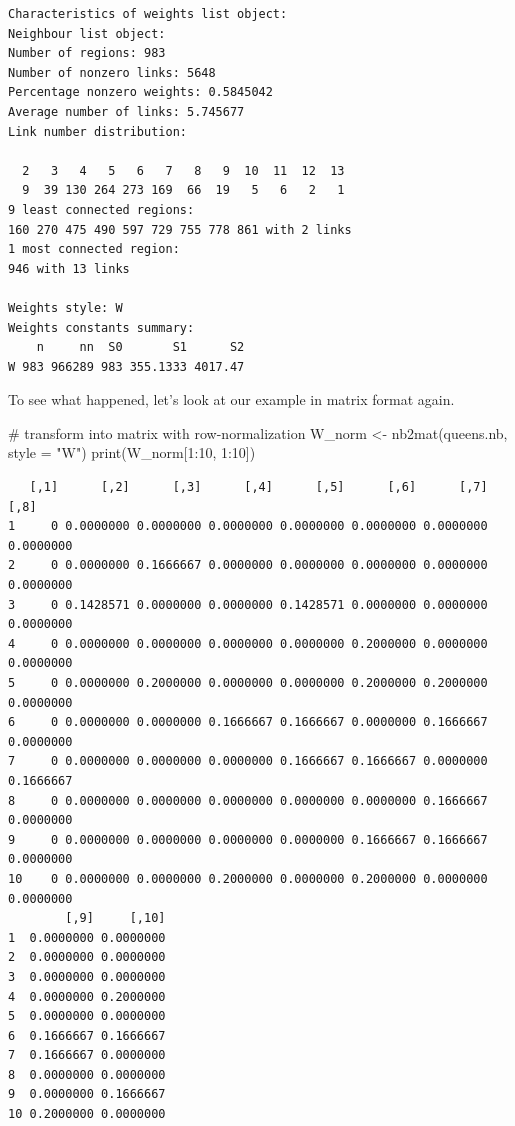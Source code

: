\documentclass[
  letterpaper,
]{scrbook}
\newenvironment{Shaded}{\begin{snugshade}}{\end{snugshade}}
\newcommand{\AttributeTok}[1]{\textcolor[rgb]{0.40,0.45,0.13}{#1}}
\newcommand{\CommentTok}[1]{\textcolor[rgb]{0.37,0.37,0.37}{#1}}
\newcommand{\DecValTok}[1]{\textcolor[rgb]{0.68,0.00,0.00}{#1}}
\newcommand{\FunctionTok}[1]{\textcolor[rgb]{0.28,0.35,0.67}{#1}}
\newcommand{\NormalTok}[1]{\textcolor[rgb]{0.00,0.23,0.31}{#1}}
\newcommand{\OtherTok}[1]{\textcolor[rgb]{0.00,0.23,0.31}{#1}}
\newcommand{\SpecialCharTok}[1]{\textcolor[rgb]{0.37,0.37,0.37}{#1}}
\newcommand{\StringTok}[1]{\textcolor[rgb]{0.13,0.47,0.30}{#1}}
\begin{document}
\begin{verbatim}
Characteristics of weights list object:
Neighbour list object:
Number of regions: 983 
Number of nonzero links: 5648 
Percentage nonzero weights: 0.5845042 
Average number of links: 5.745677 
Link number distribution:

  2   3   4   5   6   7   8   9  10  11  12  13 
  9  39 130 264 273 169  66  19   5   6   2   1 
9 least connected regions:
160 270 475 490 597 729 755 778 861 with 2 links
1 most connected region:
946 with 13 links

Weights style: W 
Weights constants summary:
    n     nn  S0       S1      S2
W 983 966289 983 355.1333 4017.47
\end{verbatim}

To see what happened, let's look at our example in matrix format again.

\begin{Shaded}
\begin{Highlighting}[]
\CommentTok{\# transform into matrix with row{-}normalization}
\NormalTok{W\_norm }\OtherTok{\textless{}{-}} \FunctionTok{nb2mat}\NormalTok{(queens.nb, }\AttributeTok{style =} \StringTok{"W"}\NormalTok{)}
\FunctionTok{print}\NormalTok{(W\_norm[}\DecValTok{1}\SpecialCharTok{:}\DecValTok{10}\NormalTok{, }\DecValTok{1}\SpecialCharTok{:}\DecValTok{10}\NormalTok{])}
\end{Highlighting}
\end{Shaded}

\begin{verbatim}
   [,1]      [,2]      [,3]      [,4]      [,5]      [,6]      [,7]      [,8]
1     0 0.0000000 0.0000000 0.0000000 0.0000000 0.0000000 0.0000000 0.0000000
2     0 0.0000000 0.1666667 0.0000000 0.0000000 0.0000000 0.0000000 0.0000000
3     0 0.1428571 0.0000000 0.0000000 0.1428571 0.0000000 0.0000000 0.0000000
4     0 0.0000000 0.0000000 0.0000000 0.0000000 0.2000000 0.0000000 0.0000000
5     0 0.0000000 0.2000000 0.0000000 0.0000000 0.2000000 0.2000000 0.0000000
6     0 0.0000000 0.0000000 0.1666667 0.1666667 0.0000000 0.1666667 0.0000000
7     0 0.0000000 0.0000000 0.0000000 0.1666667 0.1666667 0.0000000 0.1666667
8     0 0.0000000 0.0000000 0.0000000 0.0000000 0.0000000 0.1666667 0.0000000
9     0 0.0000000 0.0000000 0.0000000 0.0000000 0.1666667 0.1666667 0.0000000
10    0 0.0000000 0.0000000 0.2000000 0.0000000 0.2000000 0.0000000 0.0000000
        [,9]     [,10]
1  0.0000000 0.0000000
2  0.0000000 0.0000000
3  0.0000000 0.0000000
4  0.0000000 0.2000000
5  0.0000000 0.0000000
6  0.1666667 0.1666667
7  0.1666667 0.0000000
8  0.0000000 0.0000000
9  0.0000000 0.1666667
10 0.2000000 0.0000000
\end{verbatim}
\end{document}
